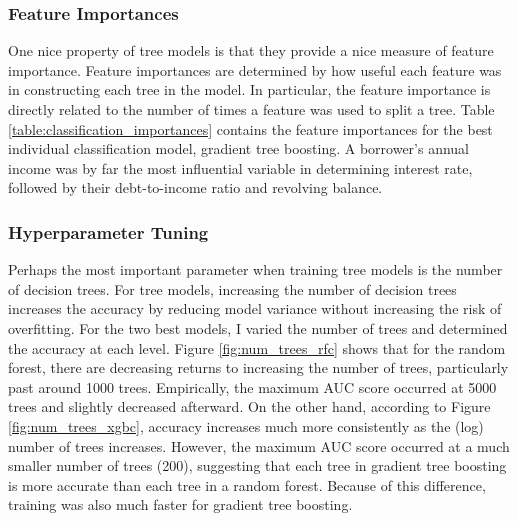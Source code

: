 \documentclass[12pt]{article}
\begin{document}






\subsubsection{Feature Importances}

One nice property of tree models is that they provide a nice measure of feature importance. Feature importances are determined by how useful each feature was in constructing each tree in the model. In particular, the feature importance is directly related to the number of times a feature was used to split a tree. Table \ref{table:classification_importances} contains the feature importances for the best individual classification model, gradient tree boosting. A borrower's annual income was by far the most influential variable in determining interest rate, followed by their debt-to-income ratio and revolving balance.



\subsubsection{Hyperparameter Tuning}

Perhaps the most important parameter when training tree models is the number of decision trees. For tree models, increasing the number of decision trees increases the accuracy by reducing model variance without increasing the risk of overfitting. For the two best models, I varied the number of trees and determined the accuracy at each level. Figure \ref{fig:num_trees_rfc} shows that for the random forest, there are decreasing returns to increasing the number of trees, particularly past around 1000 trees. Empirically, the maximum AUC score occurred at 5000 trees and slightly decreased afterward. On the other hand, according to Figure \ref{fig:num_trees_xgbc}, accuracy increases much more consistently as the (log) number of trees increases. However, the maximum AUC score occurred at a much smaller number of trees (200), suggesting that each tree in gradient tree boosting is more accurate than each tree in a random forest. Because of this difference, training was also much faster for gradient tree boosting.
\end{document}
